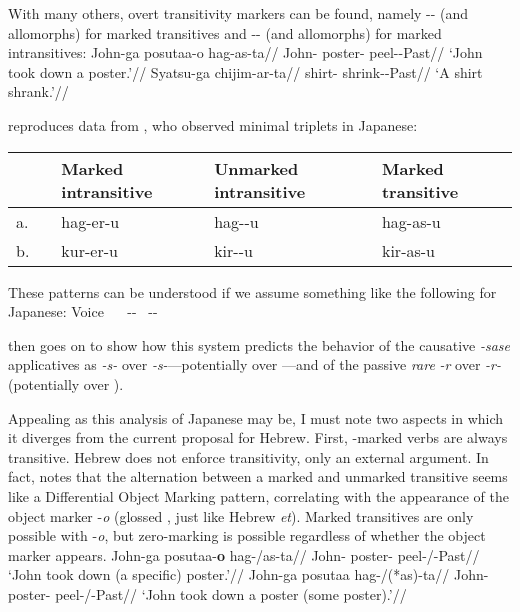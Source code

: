 With many others, overt transitivity markers can be found, namely -- (and allomorphs) for marked transitives and -- (and allomorphs) for marked intransitives:
\pex
	\a \begingl
		\gla John-ga posutaa-o hag-as-ta//
		\glb John- poster- peel--Past//
		\glft `John took down a poster.'//
	\endgl
	\a \begingl
		\gla Syatsu-ga chijim-ar-ta//
		\glb shirt- shrink--Past//
		\glft `A shirt shrank.'//
	\endgl
\xe

\cite{oseki17nyu} reproduces data from \cite{suga80}, who observed minimal triplets in Japanese:
\ex
\begin{tabular}{lllll}
	& & Marked intransitive & Unmarked intransitive & Marked transitive\\\hline
	a.& \root{\gsc{PEEL}} & hag-er-u & hag-\zero-u & hag-as-u\\
	b.& \root{\gsc{CUT}} & kur-er-u & kir-\zero-u & kir-as-u\\
\end{tabular}
\xe

These patterns can be understood if we assume something like the following for Japanese:
\pex
	\a Voice \lra~\zero
	\a {\vz} \lra~--
	\a {\vd} \lra~--
\xe

\cite{oseki17nyu} then goes on to show how this system predicts the behavior of the causative \emph{-sase} applicatives as \emph{-s-} over \emph{-s-}---potentially {\vd} over {\vd}---and of the passive \emph{rare} \emph{-r} over \emph{-r-} (potentially {\vz} over {\vz}).

Appealing as this analysis of Japanese may be, I must note two aspects in which it diverges from the current proposal for Hebrew. First, -marked verbs are always transitive. Hebrew {\vd} does not enforce transitivity, only an external argument. In fact, \citet[26]{nie17} notes that the alternation between a marked and unmarked transitive seems like a Differential Object Marking pattern, correlating with the appearance of the object marker -\emph{o} (glossed , just like Hebrew \emph{et}). Marked transitives are only possible with -\emph{o}, but zero-marking is possible regardless of whether the object marker appears.
\pex
	\a \begingl
		\gla John-ga posutaa-\textbf{o} hag-\zero/as-ta//
		\glb John- poster- peel-\zero/-Past//
		\glft `John took down (a specific) poster.'//
	\endgl
	\a \begingl
		\gla John-ga posutaa hag-\zero/(*as)-ta//
		\glb John- poster- peel-\zero/-Past//
		\glft `John took down a poster (some poster).'//
	\endgl
\xe

